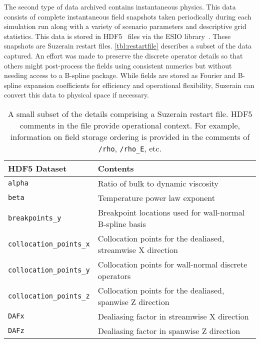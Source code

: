 The second type of data archived contains instantaneous physics.  This data
consists of complete instantaneous field snapshots taken periodically during each
simulation run along with a variety of scenario parameters and descriptive grid
statistics.  This data is stored in HDF5~\citep{hdf5} files via the ESIO
library~\citep{ESIOweb}.  These snapshots are Suzerain restart
files.  \autoref{tbl:restartfile} describes a subset of the data captured.  An
effort was made to preserve the discrete operator details so that others might
post-process the fields using consistent numerics but without needing access to
a B-spline package.  While fields are stored as Fourier and B-spline
expansion coefficients for efficiency and operational flexibility, Suzerain can convert this data to physical space if
necessary.

\begin{table}
\centering
\caption[Instantaneous fields and other details comprising a restart file]{%
  A small subset of the details comprising a Suzerain restart file.
  HDF5 comments in the file provide operational context.  For example,
  information on field storage ordering is provided in the comments of
  \texttt{/rho}, \texttt{/rho\_E}, etc.\label{tbl:restartfile}
}
\begin{small}
\begin{tabular}{p{}|p{}}
HDF5 Dataset & Contents \\ \hline \hline
\texttt{alpha                 } & Ratio of bulk to dynamic viscosity \\
\texttt{beta                  } & Temperature power law exponent \\
\texttt{breakpoints\_y        } & Breakpoint locations used for wall-normal B-spline basis \\
\texttt{collocation\_points\_x} & Collocation points for the dealiased, streamwise X direction \\
\texttt{collocation\_points\_y} & Collocation points for wall-normal discrete operators \\
\texttt{collocation\_points\_z} & Collocation points for the dealiased, spanwise Z direction \\
\texttt{DAFx                  } & Dealiasing factor in streamwise X direction \\
\texttt{DAFz                  } & Dealiasing factor in spanwise Z direction \\

\end{tabular}
\end{small}
\end{table}
